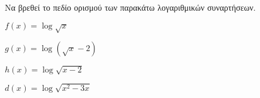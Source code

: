 Να βρεθεί το πεδίο ορισμού των παρακάτω λογαριθμικών συναρτήσεων.
\begin{rlist}
\item $ f(x)=\log{\sqrt{x}} $
\item $ g(x)=\log{\left( \sqrt{x}-2\right) } $
\item $ h(x)=\log{\sqrt{x-2}} $
\item $ d(x)=\log{\sqrt{x^2-3x} } $
\end{rlist}
